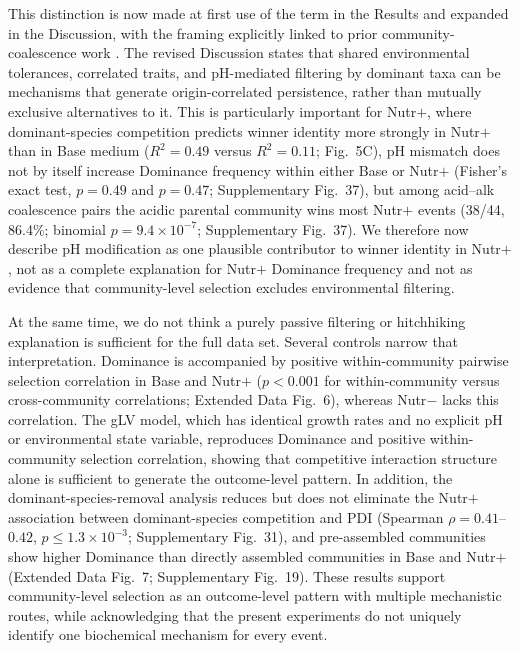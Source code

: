 This distinction is now made at first use of the term in the Results and expanded in the Discussion, with the framing explicitly linked to prior community-coalescence work \citep{Mansour2018,Rillig2015}. The revised Discussion states that shared environmental tolerances, correlated traits, and pH-mediated filtering by dominant taxa can be mechanisms that generate origin-correlated persistence, rather than mutually exclusive alternatives to it. This is particularly important for Nutr$+$, where dominant-species competition predicts winner identity more strongly in Nutr$+$ than in Base medium ($R^2 = 0.49$ versus $R^2 = 0.11$; Fig.~5C), pH mismatch does not by itself increase Dominance frequency within either Base or Nutr$+$ (Fisher's exact test, $p = 0.49$ and $p = 0.47$; Supplementary Fig.~37), but among acid--alk coalescence pairs the acidic parental community wins most Nutr$+$ events (38/44, 86.4\%; binomial $p = 9.4 \times 10^{-7}$; Supplementary Fig.~37). We therefore now describe pH modification as one plausible contributor to winner identity in Nutr$+$, not as a complete explanation for Nutr$+$ Dominance frequency and not as evidence that community-level selection excludes environmental filtering.

At the same time, we do not think a purely passive filtering or hitchhiking explanation is sufficient for the full data set. Several controls narrow that interpretation. Dominance is accompanied by positive within-community pairwise selection correlation in Base and Nutr$+$ ($p < 0.001$ for within-community versus cross-community correlations; Extended Data Fig.~6), whereas Nutr$-$ lacks this correlation. The gLV model, which has identical growth rates and no explicit pH or environmental state variable, reproduces Dominance and positive within-community selection correlation, showing that competitive interaction structure alone is sufficient to generate the outcome-level pattern. In addition, the dominant-species-removal analysis reduces but does not eliminate the Nutr$+$ association between dominant-species competition and PDI (Spearman $\rho = 0.41$--$0.42$, $p \leq 1.3 \times 10^{-3}$; Supplementary Fig.~31), and pre-assembled communities show higher Dominance than directly assembled communities in Base and Nutr$+$ (Extended Data Fig.~7; Supplementary Fig.~19). These results support community-level selection as an outcome-level pattern with multiple mechanistic routes, while acknowledging that the present experiments do not uniquely identify one biochemical mechanism for every event.

